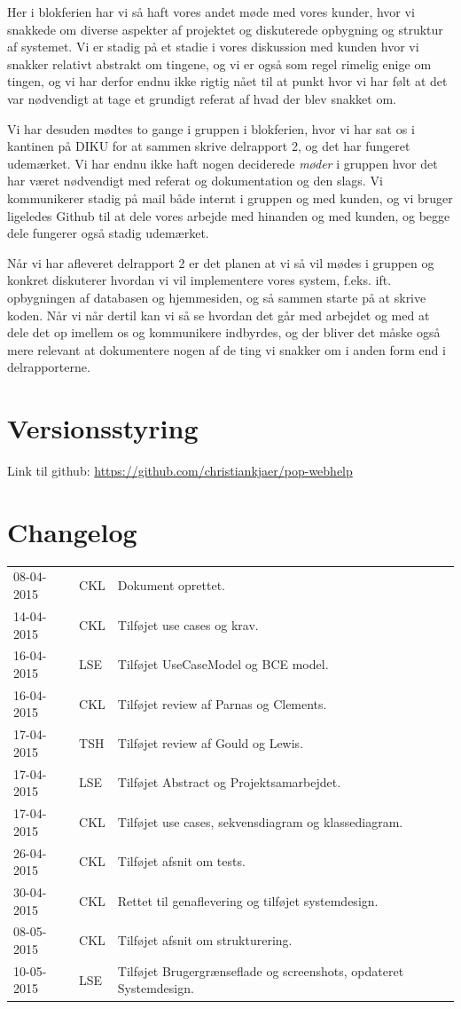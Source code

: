 \documentclass[11pt, a4paper]{article}
\begin{document}
Her i blokferien har vi så haft vores andet møde med vores kunder, hvor vi snakkede om diverse aspekter af projektet og diskuterede opbygning og struktur af systemet. Vi er stadig på et stadie i vores diskussion med kunden hvor vi snakker relativt abstrakt om tingene, og vi er også som regel rimelig enige om tingen, og vi har derfor endnu ikke rigtig nået til at punkt hvor vi har følt at det var nødvendigt at tage et grundigt referat af hvad der blev snakket om.

Vi har desuden mødtes to gange i gruppen i blokferien, hvor vi har sat os i kantinen på DIKU for at sammen skrive delrapport 2, og det har fungeret udemærket. Vi har endnu ikke haft nogen deciderede \emph{møder} i gruppen hvor det har været nødvendigt med referat og dokumentation og den slags. Vi kommunikerer stadig på mail både internt i gruppen og med kunden, og vi bruger ligeledes Github til at dele vores arbejde med hinanden og med kunden, og begge dele fungerer også stadig udemærket.

Når vi har afleveret delrapport 2 er det planen at vi så vil mødes i gruppen og konkret diskuterer hvordan vi vil implementere vores system, f.eks. ift. opbygningen af databasen og hjemmesiden, og så sammen starte på at skrive koden. Når vi når dertil kan vi så se hvordan det går med arbejdet og med at dele det op imellem os og kommunikere indbyrdes, og der bliver det måske også mere relevant at dokumentere nogen af de ting vi snakker om i anden form end i delrapporterne.

\newpage
\appendix
\section{Versionsstyring}
\label{sec:versionsstyring}
Link til github: \url{https://github.com/christiankjaer/pop-webhelp}

\section{Changelog}
\label{sec:changelog}
\begin{tabular}{l l l}
08-04-2015 & CKL & Dokument oprettet. \\
14-04-2015 & CKL & Tilføjet use cases og krav. \\
16-04-2015 & LSE & Tilføjet UseCaseModel og BCE model. \\
16-04-2015 & CKL & Tilføjet review af Parnas og Clements. \\
17-04-2015 & TSH & Tilføjet review af Gould og Lewis. \\
17-04-2015 & LSE & Tilføjet Abstract og Projektsamarbejdet. \\
17-04-2015 & CKL & Tilføjet use cases, sekvensdiagram og klassediagram. \\
26-04-2015 & CKL & Tilføjet afsnit om tests. \\
30-04-2015 & CKL & Rettet til genaflevering og tilføjet systemdesign. \\
08-05-2015 & CKL & Tilføjet afsnit om strukturering. \\
10-05-2015 & LSE & Tilføjet Brugergrænseflade og screenshots, opdateret Systemdesign. \\
\end{tabular}
\end{document}
